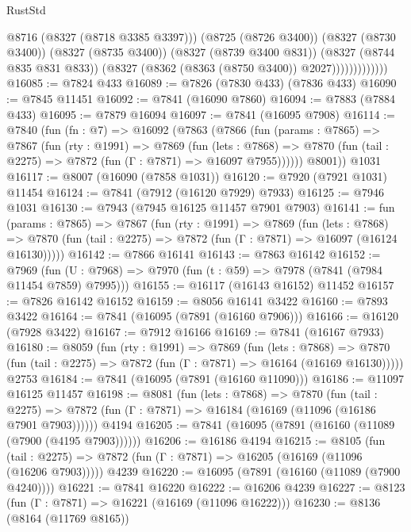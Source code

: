 \begin{lexlean}{RustStd}
\begin{coremodule}
{\begin{coremodule}
{{{{{{{{{{{{{{{{{{{{{{{{{{{{{{{{{{{{{{{{{{{{{{{{{{{{{{                            @8716
                            (@8327 (@8718 @3385 @3397)))
                          (@8725 (@8726 @3400))
                          (@8327 (@8730 @3400))
                          (@8327 (@8735 @3400))
                          (@8327 (@8739 @3400 @831))
                          (@8327 (@8744 @835 @831 @833))
                          (@8327 (@8362 (@8363 (@8750 @3400)) @2027)))))))))))))
@16085 := @7824 @433
@16089 := @7826 (@7830 @433) (@7836 @433)
@16090 := @7845 @11451
@16092 := @7841 (@16090 @7860)
@16094 := @7883 (@7884 @433)
@16095 := @7879 @16094
@16097 := @7841 (@16095 @7908)
@16114 := @7840
    (fun (fn : @7) =>
    @16092
      (@7863
        (@7866
          (fun (params : @7865) =>
          @7867
            (fun (rty : @1991) =>
            @7869
              (fun (lets : @7868) =>
              @7870 (fun (tail : @2275) => @7872 (fun (Γ : @7871) => @16097 @7955))))))
        @8001))
    @1031
@16117 := @8007 (@16090 (@7858 @1031))
@16120 := @7920 (@7921 @1031) @11454
@16124 := @7841 (@7912 (@16120 @7929) @7933)
@16125 := @7946 @1031
@16130 := @7943 (@7945 @16125 @11457 @7901 @7903)
@16141 := fun (params : @7865) =>
  @7867
    (fun (rty : @1991) =>
    @7869
      (fun (lets : @7868) =>
      @7870 (fun (tail : @2275) => @7872 (fun (Γ : @7871) => @16097 (@16124 @16130)))))
@16142 := @7866 @16141
@16143 := @7863 @16142
@16152 := @7969
    (fun (U : @7968) => @7970 (fun (t : @59) => @7978 (@7841 (@7984 @11454 @7859) @7995)))
@16155 := @16117 (@16143 @16152) @11452
@16157 := @7826 @16142 @16152
@16159 := @8056 @16141 @3422
@16160 := @7893 @3422
@16164 := @7841 (@16095 (@7891 (@16160 @7906)))
@16166 := @16120 (@7928 @3422)
@16167 := @7912 @16166
@16169 := @7841 (@16167 @7933)
@16180 := @8059
    (fun (rty : @1991) =>
    @7869
      (fun (lets : @7868) =>
      @7870 (fun (tail : @2275) => @7872 (fun (Γ : @7871) => @16164 (@16169 @16130)))))
    @2753
@16184 := @7841 (@16095 (@7891 (@16160 @11090)))
@16186 := @11097 @16125 @11457
@16198 := @8081
    (fun (lets : @7868) =>
    @7870
      (fun (tail : @2275) =>
      @7872 (fun (Γ : @7871) => @16184 (@16169 (@11096 (@16186 @7901 @7903))))))
    @4194
@16205 := @7841 (@16095 (@7891 (@16160 (@11089 (@7900 (@4195 @7903))))))
@16206 := @16186 @4194
@16215 := @8105
    (fun (tail : @2275) => @7872 (fun (Γ : @7871) => @16205 (@16169 (@11096 (@16206 @7903)))))
    @4239
@16220 := @16095 (@7891 (@16160 (@11089 (@7900 @4240))))
@16221 := @7841 @16220
@16222 := @16206 @4239
@16227 := @8123 (fun (Γ : @7871) => @16221 (@16169 (@11096 @16222)))
@16230 := @8136 (@8164 (@11769 @8165))
}}}}}}}}}}}}}}}}}}}}}}}}}}}}}}}}}}}}}}}}}}}}}}}}}}}}}}
\end{coremodule}}
\end{coremodule}
\end{lexlean}
